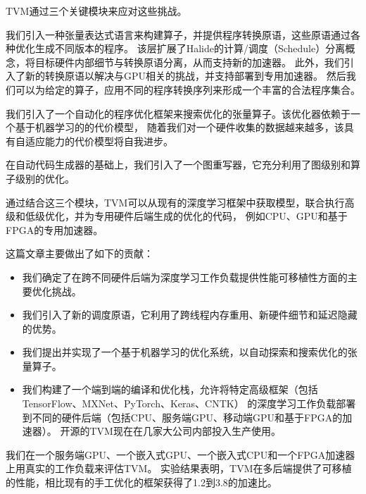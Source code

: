 TVM通过三个关键模块来应对这些挑战。
\begin{enumerate*}
    \item 我们引入一种张量表达式语言来构建算子，并提供程序转换原语，这些原语通过各种优化生成不同版本的程序。
    该层扩展了Halide的计算/调度（Schedule）分离概念，将目标硬件内部细节与转换原语分离，从而支持新的加速器。
    此外，我们引入了新的转换原语以解决与GPU相关的挑战，并支持部署到专用加速器。
    然后我们可以为给定的算子，应用不同的程序转换序列来形成一个丰富的合法程序集合。
    \item 我们引入了一个自动化的程序优化框架来搜索优化的张量算子。该优化器依赖于一个基于机器学习的的代价模型，
    随着我们对一个硬件收集的数据越来越多，该具有自适应能力的代价模型将自我进步。
    \item 在自动代码生成器的基础上，我们引入了一个图重写器，它充分利用了图级别和算子级别的优化。
\end{enumerate*} 

通过结合这三个模块，TVM可以从现有的深度学习框架中获取模型，联合执行高级和低级优化，并为专用硬件后端生成的优化的代码，
例如CPU、GPU和基于FPGA的专用加速器。

这篇文章主要做出了如下的贡献：

\begin{itemize}
    \item 我们确定了在跨不同硬件后端为深度学习工作负载提供性能可移植性方面的主要优化挑战。
    \item 我们引入了新的调度原语，它利用了跨线程内存重用、新硬件细节和延迟隐藏的优势。
    \item 我们提出并实现了一个基于机器学习的优化系统，以自动探索和搜索优化的张量算子。
    \item 我们构建了一个端到端的编译和优化栈，允许将特定高级框架（包括TensorFlow、MXNet、PyTorch、Keras、CNTK）
    的深度学习工作负载部署到不同的硬件后端（包括CPU、服务端GPU、移动端GPU和基于FPGA的加速器）。
    开源的TVM现在在几家大公司内部投入生产使用。
\end{itemize}

我们在一个服务端GPU、一个嵌入式GPU、一个嵌入式CPU和一个FPGA加速器上用真实的工作负载来评估TVM。
实验结果表明，TVM在多后端提供了可移植的性能，相比现有的手工优化的框架获得了1.2到3.8的加速比。
